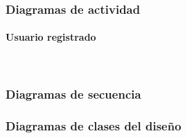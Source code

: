 \subsubsection{Diagramas de actividad}

\paragraph{Usuario registrado} \mbox{}\\

\subsubsection{Diagramas de secuencia}

\subsubsection{Diagramas de clases del diseño}


